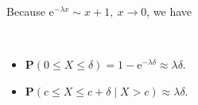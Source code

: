 Because $\mathrm{e}^{-\lambda x} \sim x + 1, ~x \to 0$, we have
\begin{property} ~
    \begin{itemize} 
        \item $\mathbf{P}(0 \leq X \leq \delta) = 1 - \mathrm{e}^{-\lambda \delta} \approx \lambda \delta$.
        \item $\mathbf{P}(c \leq X \leq c + \delta \mid X > c) \approx \lambda \delta$.
    \end{itemize}
\end{property}
